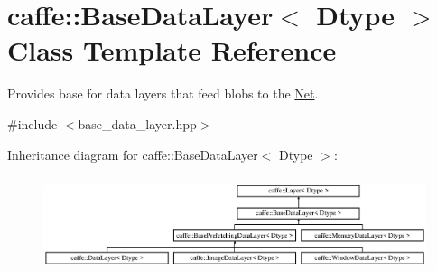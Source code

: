 \hypertarget{classcaffe_1_1BaseDataLayer}{}\section{caffe\+:\+:Base\+Data\+Layer$<$ Dtype $>$ Class Template Reference}
\label{classcaffe_1_1BaseDataLayer}


Provides base for data layers that feed blobs to the \hyperlink{classcaffe_1_1Net}{Net}.  




{\ttfamily \#include $<$base\+\_\+data\+\_\+layer.\+hpp$>$}

Inheritance diagram for caffe\+:\+:Base\+Data\+Layer$<$ Dtype $>$\+:\begin{figure}[H]
\begin{center}
\leavevmode
\includegraphics[height=2.828283cm]{classcaffe_1_1BaseDataLayer}
\end{center}
\end{figure}
